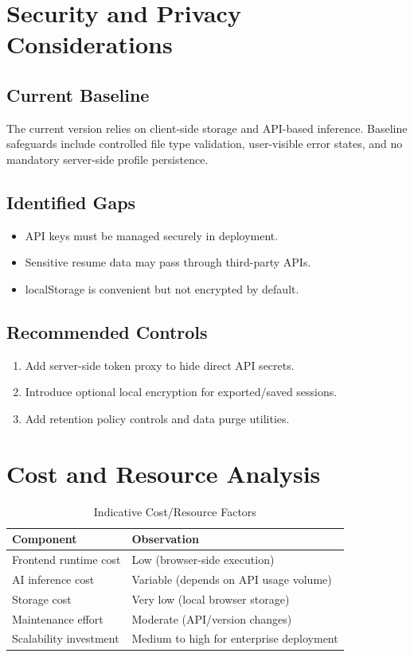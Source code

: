 \documentclass[12pt,a4paper]{report}
\begin{document}
\section{Security and Privacy Considerations}
\subsection{Current Baseline}
The current version relies on client-side storage and API-based inference. Baseline safeguards include controlled file type validation, user-visible error states, and no mandatory server-side profile persistence.

\subsection{Identified Gaps}
\begin{itemize}
  \item API keys must be managed securely in deployment.
  \item Sensitive resume data may pass through third-party APIs.
  \item localStorage is convenient but not encrypted by default.
\end{itemize}

\subsection{Recommended Controls}
\begin{enumerate}
  \item Add server-side token proxy to hide direct API secrets.
  \item Introduce optional local encryption for exported/saved sessions.
  \item Add retention policy controls and data purge utilities.
\end{enumerate}

\section{Cost and Resource Analysis}
\begin{table}[H]
\centering
\caption{Indicative Cost/Resource Factors}
\begin{tabular}{|p{2.2in}|p{2.2in}|}
\hline
\textbf{Component} & \textbf{Observation} \\
\hline
Frontend runtime cost & Low (browser-side execution) \\
\hline
AI inference cost & Variable (depends on API usage volume) \\
\hline
Storage cost & Very low (local browser storage) \\
\hline
Maintenance effort & Moderate (API/version changes) \\
\hline
Scalability investment & Medium to high for enterprise deployment \\
\hline
\end{tabular}
\end{table}
\end{document}
